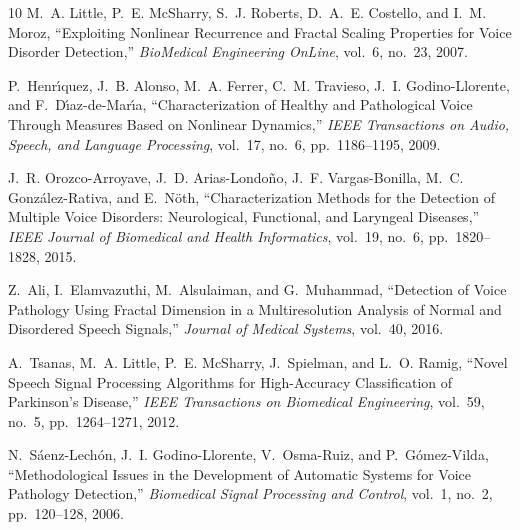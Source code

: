 \documentclass[conference]{IEEEtran}
\begin{document}
\begin{thebibliography}{10}
  M.~A. Little, P.~E. McSharry, S.~J. Roberts, D.~A.~E. Costello,
  and I.~M. Moroz,
  ``Exploiting Nonlinear Recurrence and Fractal Scaling Properties
  for Voice Disorder Detection,''
  \emph{BioMedical Engineering OnLine},
  vol.~6, no.~23, 2007.

  P.~Henr\'{\i}quez, J.~B. Alonso, M.~A. Ferrer, C.~M. Travieso,
  J.~I. Godino-Llorente, and F.~D\'{\i}az-de-Mar\'{\i}a,
  ``Characterization of Healthy and Pathological Voice Through Measures
  Based on Nonlinear Dynamics,''
  \emph{IEEE Transactions on Audio, Speech, and Language Processing},
  vol.~17, no.~6, pp.~1186--1195, 2009.

  J.~R. Orozco-Arroyave, J.~D. Arias-Londo\~{n}o,
  J.~F. Vargas-Bonilla, M.~C. Gonz\'alez-Rativa, and E.~N\"oth,
  ``Characterization Methods for the Detection of Multiple Voice Disorders:
  Neurological, Functional, and Laryngeal Diseases,''
  \emph{IEEE Journal of Biomedical and Health Informatics},
  vol.~19, no.~6, pp.~1820--1828, 2015.

  Z.~Ali, I.~Elamvazuthi, M.~Alsulaiman, and G.~Muhammad,
  ``Detection of Voice Pathology Using Fractal Dimension in a Multiresolution
  Analysis of Normal and Disordered Speech Signals,''
  \emph{Journal of Medical Systems},
  vol.~40, 2016.

  A.~Tsanas, M.~A. Little, P.~E. McSharry, J.~Spielman, and L.~O. Ramig,
  ``Novel Speech Signal Processing Algorithms for High-Accuracy Classification
  of Parkinson's Disease,''
  \emph{IEEE Transactions on Biomedical Engineering},
  vol.~59, no.~5, pp.~1264--1271, 2012.

  N.~S\'aenz-Lech\'on, J.~I. Godino-Llorente, V.~Osma-Ruiz,
  and P.~G\'omez-Vilda,
  ``Methodological Issues in the Development of Automatic Systems
  for Voice Pathology Detection,''
  \emph{Biomedical Signal Processing and Control},
  vol.~1, no.~2, pp.~120--128, 2006.

  \end{thebibliography}

  
\end{document}
